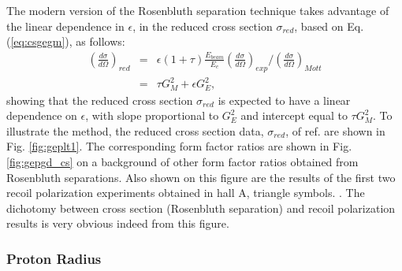 The modern version of the Rosenbluth separation technique takes advantage 
of the linear dependence in $\epsilon$, in the reduced 
cross section $\sigma_{red}$, based on Eq. (\ref{eq:csgegm}), as follows:
\begin{eqnarray}
\left(\frac{d\sigma}{d\Omega}\right)_{red} &=& \epsilon(1+\tau)\frac{E_{beam}}{E_e}\left(\frac{d\sigma}{d\Omega}\right)_{exp} / \left(\frac{d\sigma}{d\Omega}\right)_{Mott} \nonumber \\
&=& \tau G_{M}^2+\epsilon G_{E}^2,
\label{eq:redcs}
\end{eqnarray}
\noindent showing that the reduced cross section $\sigma_{red}$ is expected to have a linear dependence on $\epsilon$, with slope proportional 
to $G_{E}^2$ and intercept equal to $\tau G_{M}^2$. To illustrate the method, the reduced cross section data, $\sigma_{red}$, of ref. 
\cite{qattan05} are shown in Fig. \ref{fig:geplt1}. The 
corresponding form factor ratios are shown in Fig. \ref{fig:gepgd_cs} on a background of other form factor ratios obtained from Rosenbluth
separations. Also shown on this figure are the results of the first two recoil polarization experiments obtained in hall A, triangle symbols. 
\cite{jones,punjabi05A,punjabi05B,gayou:2002}. The dichotomy between cross section (Rosenbluth separation) and recoil polarization results is very obvious indeed from this figure.

\subsubsection{Proton Radius}

